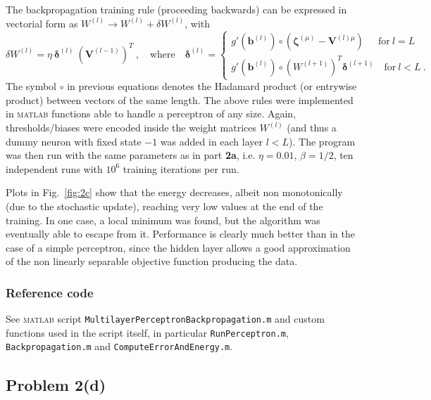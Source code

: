 \documentclass[12pt,titlepage]{article}
\begin{document}
The backpropagation training rule (proceeding backwards) can be expressed in vectorial form as ${W^{(l)} \rightarrow W^{(l)} + \delta W^{(l)}}$, with
\begin{equation}
\delta W^{(l)} =  \eta \ \bm{\delta}^{(l)} \ (\bm{V}^{(l-1)})^T \ ,\quad \text{where} \quad \bm{\delta}^{(l)} =  \begin{cases} g'(\bm{b}^{(l)}) \circ (\bm{\zeta}^{(\mu)} - \bm{V}^{(l) \mu}) \quad \ \ \text{for} \ l=L \\ 
g'(\bm{b}^{(l)}) \circ (W^{(l+1)})^T \bm{\delta}^{(l+1)} \quad \text{for} \ l < L \ .\end{cases}
\end{equation}
The symbol $\circ$ in previous equations denotes the Hadamard product (or entrywise product) between vectors of the same length. The above rules were implemented in \textsc{matlab} functions able to handle a perceptron of any size. Again, thresholds/biases were encoded inside the weight matrices $W^{(l)}$ (and thus a dummy neuron with fixed state $-1$ was added in each layer $l<L$). The program was then run with the same parameters as in part \textbf{2a}, i.e. $\eta = 0.01$, $\beta = 1/2$, ten independent runs with $10^6$ training iterations per run.

Plots in Fig.~\ref{fig:2c} show that the energy decreases, albeit non monotonically (due to the stochastic update), reaching very low values at the end of the training. In one case, a local minimum was found, but the algorithm was eventually able to escape from it. Performance is clearly much better than in the case of a simple perceptron, since the hidden layer allows a good approximation of the non linearly separable objective function producing the data.

\vspace*{-0.3cm}
\subsubsection*{Reference code}
\vspace*{-0.2cm}
See \textsc{matlab} script \verb!MultilayerPerceptronBackpropagation.m! and custom functions used in the script itself, in particular \verb!RunPerceptron.m!, \verb!Backpropagation.m! and \verb!ComputeErrorAndEnergy.m!.
\enlargethispage{\baselineskip}

\clearpage

\restoregeometry


\subsection*{Problem 2(d)}
\end{document}
